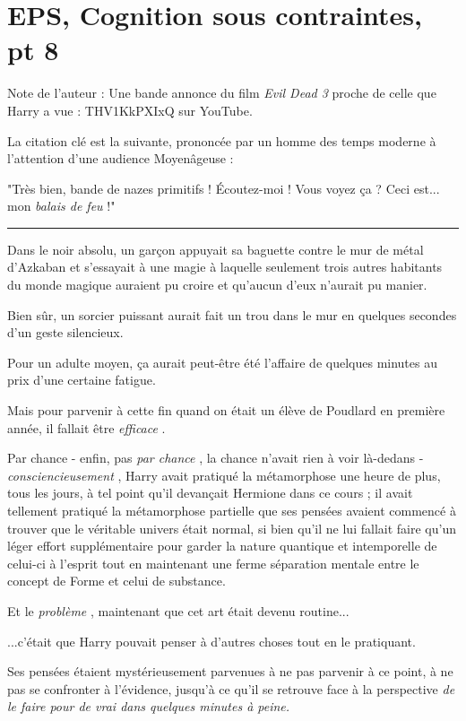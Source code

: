 
\chapter{EPS, Cognition sous contraintes, pt 8}

Note de l'auteur : Une bande annonce du film \emph{Evil Dead 3}  proche de celle que Harry a vue : THV1KkPXIxQ sur YouTube.

La citation clé est la suivante, prononcée par un homme des temps moderne à l'attention d'une audience Moyenâgeuse :

"Très bien, bande de nazes primitifs ! Écoutez-moi ! Vous voyez ça ? Ceci est... mon \emph{balais de feu}  !"
\par\noindent\rule{\textwidth}{0.4pt}
Dans le noir absolu, un garçon appuyait sa baguette contre le mur de métal d'Azkaban et s'essayait à une magie à laquelle seulement trois autres habitants du monde magique auraient pu croire et qu'aucun d'eux n'aurait pu manier.

Bien sûr, un sorcier puissant aurait fait un trou dans le mur en quelques secondes d'un geste silencieux.

Pour un adulte moyen, ça aurait peut-être été l'affaire de quelques minutes au prix d'une certaine fatigue.

Mais pour parvenir à cette fin quand on était un élève de Poudlard en première année, il fallait être \emph{efficace} .

Par chance - enfin, pas \emph{par chance} , la chance n'avait rien à voir là-dedans - \emph{consciencieusement} , Harry avait pratiqué la métamorphose une heure de plus, tous les jours, à tel point qu'il devançait Hermione dans ce cours ; il avait tellement pratiqué la métamorphose partielle que ses pensées avaient commencé à trouver que le véritable univers était normal, si bien qu'il ne lui fallait faire qu'un léger effort supplémentaire pour garder la nature quantique et intemporelle de celui-ci à l'esprit tout en maintenant une ferme séparation mentale entre le concept de Forme et celui de substance.

Et le \emph{problème} , maintenant que cet art était devenu routine...

...c'était que Harry pouvait penser à d'autres choses tout en le pratiquant.

Ses pensées étaient mystérieusement parvenues à ne pas parvenir à ce point, à ne pas se confronter à l'évidence, jusqu'à ce qu'il se retrouve face à la perspective \emph{de le faire pour de vrai dans quelques minutes à peine.} 

